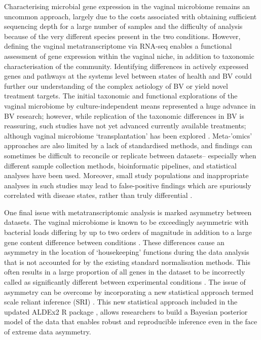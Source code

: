 \documentclass[sn-mathphys,Numbered]{sn-jnl}%
\begin{document}
Characterising microbial gene expression in the vaginal microbiome remains an uncommon approach, largely due to the costs associated with obtaining sufficient sequencing depth for a large number of samples and the difficulty of analysis because of the very different species present in the two conditions. However, defining the vaginal metatranscriptome via RNA-seq enables a functional assessment of gene expression within the vaginal niche, in addition to taxonomic characterisation of the community. Identifying differences in actively expressed genes and pathways at the systems level between states of health and BV could further our understanding of the complex aetiology of BV or yield novel treatment targets. The initial taxonomic \citep{Ravel:2010} and functional \citep{goltsman_metagenomic_2018} explorations of the vaginal microbiome by culture-independent means represented a huge advance in BV research; however, while replication of the taxonomic differences in BV is reassuring, such studies have not yet advanced currently available treatments; although vaginal microbiome `transplantation' has been explored \citep{Lev-Sagie:2019aa}. Meta-'omics' approaches are also limited by a lack of standardised methods, and findings can sometimes be difficult to reconcile or replicate between datasets-- especially when different sample collection methods, bioinformatic pipelines, and statistical analyses have been used. Moreover, small study populations and inappropriate analyses in such studies may lead to false-positive findings which are spuriously correlated with disease states, rather than truly differential \citep{nixon2023scale}. 

One final issue with metatranscriptomic analysis is marked asymmetry between datasets. The vaginal microbiome is known to be exceedingly asymmetric with bacterial loads differing by up to two orders of magnitude \cite{Zozaya:2010} in addition to a large gene content difference between conditions \cite{macklaim:2013, Ma:2020aa, France:2022aa}. These differences cause an asymmetry in the location of `housekeeping' functions during the data analysis that is not accounted for by the existing standard normalisation methods. This often results in a large proportion of all genes in the dataset to be incorrectly called as significantly different between experimental conditions \cite{gloorScale, McGovern2023}. The issue of asymmetry can be overcome by incorporating a new statistical approach termed scale reliant inference (SRI) \cite{nixon2023scale}. This new statistical approach included in the updated ALDEx2 R package \cite{fernandes:2013,gloorScale}, allows researchers to build a Bayesian posterior model of the data that enables robust and reproducible inference even in the face of extreme data asymmetry.
\end{document}

